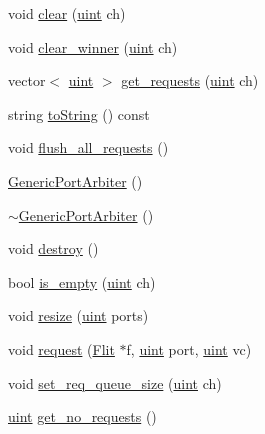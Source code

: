 \begin{CompactItemize}
\item 
void \hyperlink{classGenericPortArbiter_0ae12cea5cad66f5ef59129e93248e11}{clear} (\hyperlink{outputBuffer_8h_91ad9478d81a7aaf2593e8d9c3d06a14}{uint} ch)
\item 
void \hyperlink{classGenericPortArbiter_63d8b70b6215000469874aa5659cc416}{clear\_\-winner} (\hyperlink{outputBuffer_8h_91ad9478d81a7aaf2593e8d9c3d06a14}{uint} ch)
\item 
vector$<$ \hyperlink{outputBuffer_8h_91ad9478d81a7aaf2593e8d9c3d06a14}{uint} $>$ \hyperlink{classGenericPortArbiter_cd5a78f1bf96701f5371bbcd601d9e53}{get\_\-requests} (\hyperlink{outputBuffer_8h_91ad9478d81a7aaf2593e8d9c3d06a14}{uint} ch)
\item 
string \hyperlink{classGenericPortArbiter_1ceacc98efaee4d98b4f65a401ea10e2}{toString} () const 
\item 
void \hyperlink{classGenericPortArbiter_b593b8edfe4586255c61cb0219f3fb86}{flush\_\-all\_\-requests} ()
\item 
\hyperlink{classGenericPortArbiter_d7a567eb5055a68231d045583ed8d5a7}{GenericPortArbiter} ()
\item 
\hyperlink{classGenericPortArbiter_2bd7c52f5d2a71863f73f6922520fef8}{$\sim$GenericPortArbiter} ()
\item 
void \hyperlink{classGenericPortArbiter_c4375af1ce810c31e11c03a3b3ffc426}{destroy} ()
\item 
bool \hyperlink{classGenericPortArbiter_a01546e85da0a6d1c1194fbf82f013bb}{is\_\-empty} (\hyperlink{outputBuffer_8h_91ad9478d81a7aaf2593e8d9c3d06a14}{uint} ch)
\item 
void \hyperlink{classGenericPortArbiter_3b94b47628229ee3142907005020eb86}{resize} (\hyperlink{outputBuffer_8h_91ad9478d81a7aaf2593e8d9c3d06a14}{uint} ports)
\item 
void \hyperlink{classGenericPortArbiter_1480ee32b7d8003479d2404a4b279c56}{request} (\hyperlink{classFlit}{Flit} $\ast$f, \hyperlink{outputBuffer_8h_91ad9478d81a7aaf2593e8d9c3d06a14}{uint} port, \hyperlink{outputBuffer_8h_91ad9478d81a7aaf2593e8d9c3d06a14}{uint} vc)
\item 
void \hyperlink{classGenericPortArbiter_50daec6e98669e01d74557dfb84b462f}{set\_\-req\_\-queue\_\-size} (\hyperlink{outputBuffer_8h_91ad9478d81a7aaf2593e8d9c3d06a14}{uint} ch)
\item 
\hyperlink{outputBuffer_8h_91ad9478d81a7aaf2593e8d9c3d06a14}{uint} \hyperlink{classGenericPortArbiter_f58d4de9d0b9e07a44f3f7185f4d11d9}{get\_\-no\_\-requests} ()
\item 

\end{CompactItemize}
